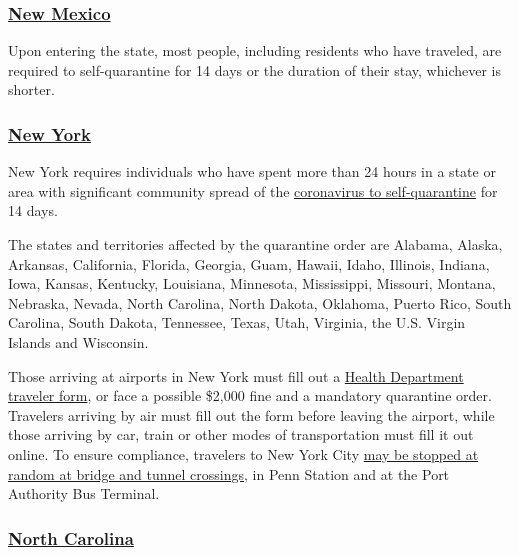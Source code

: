 \hypertarget{new-mexico}{%
\subsubsection{\texorpdfstring{\href{https://www.newmexico.org/covid-19-traveler-information/}{New
Mexico}}{New Mexico}}\label{new-mexico}}

Upon entering the state, most people, including residents who have
traveled, are required to self-quarantine for 14 days or the duration of
their stay, whichever is shorter.

\hypertarget{new-york}{%
\subsubsection{\texorpdfstring{\href{https://coronavirus.health.ny.gov/covid-19-travel-advisory}{New
York}}{New York}}\label{new-york}}

New York requires individuals who have spent more than 24 hours in a
state or area with significant community spread of the
\href{https://www.nytimes3xbfgragh.onion/2020/08/16/nyregion/coronavirus-quarantine-nyc.html}{coronavirus
to self-quarantine} for 14 days.

The states and territories affected by the quarantine order are Alabama,
Alaska, Arkansas, California, Florida, Georgia, Guam, Hawaii, Idaho,
Illinois, Indiana, Iowa, Kansas, Kentucky, Louisiana, Minnesota,
Mississippi, Missouri, Montana, Nebraska, Nevada, North Carolina, North
Dakota, Oklahoma, Puerto Rico, South Carolina, South Dakota, Tennessee,
Texas, Utah, Virginia, the U.S. Virgin Islands and Wisconsin.

Those arriving at airports in New York must fill out a
\href{https://forms.ny.gov/s3/Welcome-to-New-York-State-Traveler-Health-Form}{Health
Department traveler form}, or face a possible \$2,000 fine and a
mandatory quarantine order. Travelers arriving by air must fill out the
form before leaving the airport, while those arriving by car, train or
other modes of transportation must fill it out online. To ensure
compliance, travelers to New York City
\href{https://www.nytimes3xbfgragh.onion/2020/08/05/nyregion/nyc-coronavirus-quarantine-checkpoints.html}{may
be stopped at random at bridge and tunnel crossings}, in Penn Station
and at the Port Authority Bus Terminal.

\hypertarget{north-carolina}{%
\subsubsection{\texorpdfstring{\href{https://www.nc.gov/covid-19/covid-19-travel-resources}{North
Carolina}}{North Carolina}}\label{north-carolina}}

